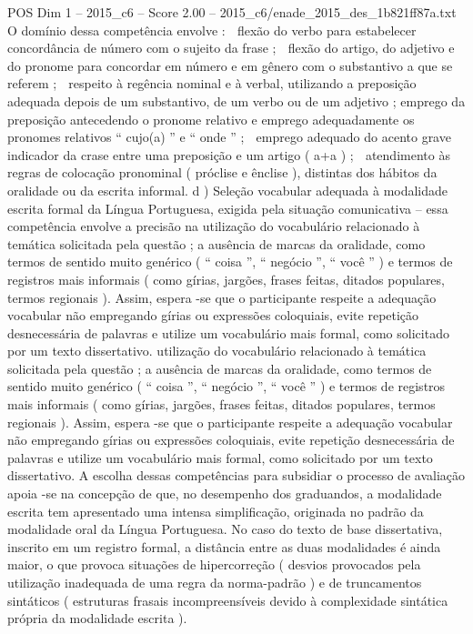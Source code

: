 \begin{textsample}{POS Dim 1 – 2015\_c6 – Score 2.00 – 2015\_c6/enade\_2015\_des\_1b821ff87a.txt}
O domínio dessa competência envolve :  flexão do verbo para estabelecer concordância de número com o sujeito da frase ;  flexão do artigo, do adjetivo e do pronome para concordar em número e em gênero com o substantivo a que se referem ;  respeito à regência nominal e à verbal, utilizando a preposição adequada depois de um substantivo, de um verbo ou de um adjetivo ; emprego da preposição antecedendo o pronome relativo e emprego adequadamente os pronomes relativos “ cujo(a) ” e “ onde ” ;  emprego adequado do acento grave indicador da crase entre uma preposição e um artigo ( a+a ) ;  atendimento às regras de colocação pronominal ( próclise e ênclise ), distintas dos hábitos da oralidade ou da escrita informal. d ) Seleção vocabular adequada à modalidade escrita formal da Língua Portuguesa, exigida pela situação comunicativa – essa competência envolve a precisão na utilização do vocabulário relacionado à temática solicitada pela questão ; a ausência de marcas da oralidade, como termos de sentido muito genérico ( “ coisa ”, “ negócio ”, “ você ” ) e termos de registros mais informais ( como gírias, jargões, frases feitas, ditados populares, termos regionais ).
Assim, espera -se que o participante respeite a adequação vocabular não empregando gírias ou expressões coloquiais, evite repetição desnecessária de palavras e utilize um vocabulário mais formal, como solicitado por um texto dissertativo. utilização do vocabulário relacionado à temática solicitada pela questão ; a ausência de marcas da oralidade, como termos de sentido muito genérico ( “ coisa ”, “ negócio ”, “ você ” ) e termos de registros mais informais ( como gírias, jargões, frases feitas, ditados populares, termos regionais ).
Assim, espera -se que o participante respeite a adequação vocabular não empregando gírias ou expressões coloquiais, evite repetição desnecessária de palavras e utilize um vocabulário mais formal, como solicitado por um texto dissertativo.
A escolha dessas competências para subsidiar o processo de avaliação apoia -se na concepção de que, no desempenho dos graduandos, a modalidade escrita tem apresentado uma intensa simplificação, originada no padrão da modalidade oral da Língua Portuguesa.
No caso do texto de base dissertativa, inscrito em um registro formal, a distância entre as duas modalidades é ainda maior, o que provoca situações de hipercorreção ( desvios provocados pela utilização inadequada de uma regra da norma-padrão ) e de truncamentos sintáticos ( estruturas frasais incompreensíveis devido à complexidade sintática própria da modalidade escrita ).

\end{textsample}
